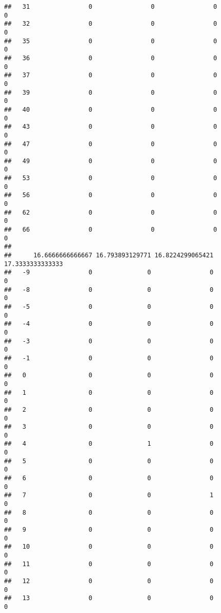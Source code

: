 \documentclass[]{article}
\begin{document}
\begin{verbatim}
##   31                0                0                0                0
##   32                0                0                0                0
##   35                0                0                0                0
##   36                0                0                0                0
##   37                0                0                0                0
##   39                0                0                0                0
##   40                0                0                0                0
##   43                0                0                0                0
##   47                0                0                0                0
##   49                0                0                0                0
##   53                0                0                0                0
##   56                0                0                0                0
##   62                0                0                0                0
##   66                0                0                0                0
##     
##      16.6666666666667 16.793893129771 16.8224299065421 17.3333333333333
##   -9                0               0                0                0
##   -8                0               0                0                0
##   -5                0               0                0                0
##   -4                0               0                0                0
##   -3                0               0                0                0
##   -1                0               0                0                0
##   0                 0               0                0                0
##   1                 0               0                0                0
##   2                 0               0                0                0
##   3                 0               0                0                0
##   4                 0               1                0                0
##   5                 0               0                0                0
##   6                 0               0                0                0
##   7                 0               0                1                0
##   8                 0               0                0                0
##   9                 0               0                0                0
##   10                0               0                0                0
##   11                0               0                0                0
##   12                0               0                0                0
##   13                0               0                0                0

\end{verbatim}
\end{document}
